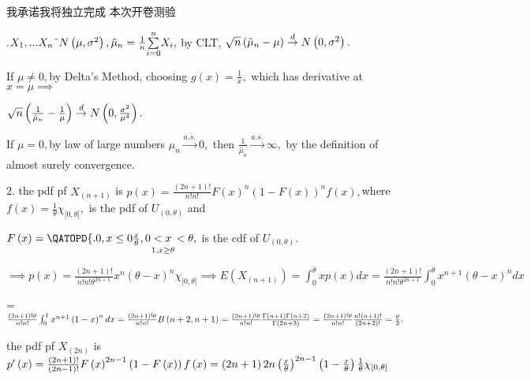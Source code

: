 \documentclass{article}
\begin{document}
我承诺我将独立完成%
本次开卷测验

.$X_{1},...X_{n}\symbol{126}N\left( \mu ,\sigma ^{2}\right) ,\hat{%
\mu}_{n}=\frac{1}{n}\underset{i=0}{\overset{n}{\sum }}X_{i},$ by CLT, $\sqrt{%
n}\left( \hat{\mu}_{n}-\mu \right) \overset{d}{\rightarrow }N\left( 0,\sigma
^{2}\right) .$

If $\mu \neq 0,$by Delta's Method, choosing $g\left( x\right) =\frac{1}{x},$%
which has derivative at $x=\mu \implies $

$\sqrt{n}\left( \frac{1}{\hat{\mu}_{n}}-\frac{1}{\mu }\right) \overset{d}{%
\rightarrow }N\left( 0,\frac{\sigma ^{2}}{\mu ^{4}}\right) .$

If $\mu =0,$by law of large numbers $\hat{\mu}_{n}\overset{a.s.}{\rightarrow 
}0,$ then $\frac{1}{\hat{\mu}_{n}}\overset{a.s.}{\rightarrow }\infty ,$ by
the definition of almost surely convergence.

2. the pdf pf $X_{\left( n+1\right) }$ is $p\left( x\right) =\frac{\left(
2n+1\right) !}{n!n!}F\left( x\right) ^{n}\left( 1-F\left( x\right) \right)
^{n}f\left( x\right) ,$where $f\left( x\right) =\frac{1}{\theta }\chi
_{\lbrack 0,\theta ]},$ is the pdf of $U_{\left( 0,\theta \right) }$ and

$F\left( x\right) =\QATOPD\{ . {0,x\leq 0}{\underset{1,x\geq \theta }{\frac{x%
}{\theta },0<x\,<\theta }},$ is the cdf of $U_{\left( 0,\theta \right) }.$

$\implies p\left( x\right) =\frac{\left( 2n+1\right) !}{n!n!\theta ^{2n+1}}%
x^{n}\left( \theta -x\right) ^{n}\chi _{\lbrack 0,\theta ]}\implies E\left(
X_{\left( n+1\right) }\right) =\int_{0}^{\theta }xp(x)dx=\frac{\left(
2n+1\right) !}{n!n!\theta ^{2n+1}}\int_{0}^{\theta }x^{n+1}\left( \theta
-x\right) ^{n}dx$

=$\frac{\left( 2n+1\right) !\theta }{n!n!}\int_{0}^{1}x^{n+1}\left(
1-x\right) ^{n}dx=\frac{\left( 2n+1\right) !\theta }{n!n!}B\left(
n+2,n+1\right) =\frac{\left( 2n+1\right) !\theta }{n!n!}\frac{\Gamma \left(
n+1\right) \Gamma \left( n+2\right) }{\Gamma \left( 2n+3\right) }=\frac{%
\left( 2n+1\right) !\theta }{n!n!}\frac{n!\left( n+1\right) !}{\left(
2n+2\right) !}=\frac{\theta }{2}.$

the pdf pf $X_{\left( 2n\right) }$ is $p^{\prime }\left( x\right) =\frac{%
\left( 2n+1\right) !}{\left( 2n-1\right) !}F\left( x\right) ^{2n-1}\left(
1-F\left( x\right) \right) f\left( x\right) =\left( 2n+1\right) 2n\left( 
\frac{x}{\theta }\right) ^{2n-1}\left( 1-\frac{x}{\theta }\right) \frac{1}{%
\theta }\chi _{\lbrack 0,\theta ]}$
\end{document}
